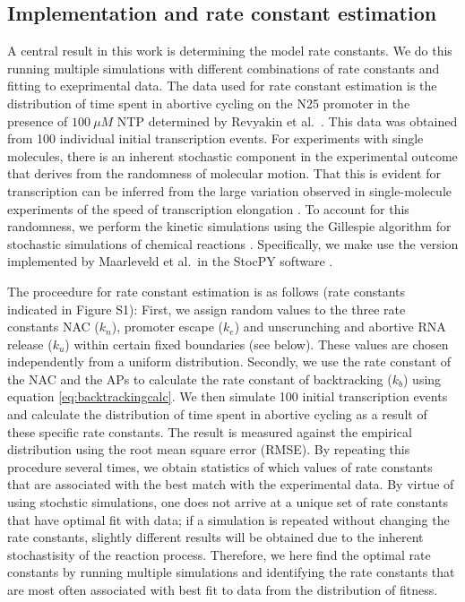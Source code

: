 \subsection{Implementation and rate constant estimation}
A central result in this work is determining the model rate constants. We do
this running multiple simulations with different combinations of rate
constants and fitting to exeprimental data. The data used for rate constant
estimation is the distribution of time spent in abortive cycling on the N25
promoter in the presence of $100\ \mu M$ NTP determined by Revyakin et al.\
\cite{revyakin_abortive_2006}. This data was obtained from 100 individual
initial transcription events. For experiments with single molecules, there is
an inherent stochastic component in the experimental outcome that derives from
the randomness of molecular motion. That this is evident for transcription can
be inferred from the large variation observed in single-molecule experiments
of the speed of transcription elongation \cite{adelman_single_2002,
tolic-norrelykke_diversity_2004}. To account for this randomness, we perform
the kinetic simulations using the Gillespie algorithm for stochastic
simulations of chemical reactions \cite{gillespie_exact_1977}. Specifically,
we make use the version implemented by Maarleveld et al.\ in the StocPY
software \cite{maarleveld_stochpy:_2013}.

The proceedure for rate constant estimation is as follows (rate constants
indicated in Figure S1): First, we assign random values to the three rate
constants NAC ($k_n$), promoter escape ($k_e$) and unscrunching and abortive
RNA release ($k_u$) within certain fixed boundaries (see below). These values
are chosen independently from a uniform distribution. Secondly, we use the
rate constant of the NAC and the APs to calculate the rate constant of
backtracking ($k_b$) using equation \ref{eq:backtrackingcalc}. We then
simulate 100 initial transcription events and calculate the distribution of
time spent in abortive cycling as a result of these specific rate constants.
The result is measured against the empirical distribution
\cite{revyakin_abortive_2006} using the root mean square error (RMSE). By
repeating this procedure several times, we obtain statistics of which
values of rate constants that are associated with the best match with the
experimental data. By virtue of using stochstic simulations, one does not
arrive at a unique set of rate constants that have optimal fit with data; if a
simulation is repeated without changing the rate constants, slightly different
results will be obtained due to the inherent stochastisity of the reaction
process. Therefore, we here find the optimal rate constants by running
multiple simulations and identifying the rate constants that are most often
associated with best fit to data from the distribution of fitness.


